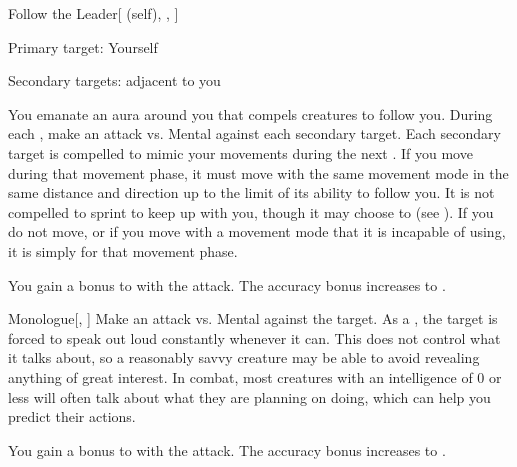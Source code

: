 \lowercase{\hypertarget{spell:Follow the Leader}{}}\label{spell:Follow the Leader}
\begin{attuneability}[Rank 3]{\hypertarget{spell:Follow the Leader}{Follow the Leader}}[ (self), , ]

Primary target: Yourself
\par\noindent
Secondary targets:  adjacent to you

You emanate an aura around you that compels creatures to follow you.
During each , make an attack vs. Mental against each secondary target.
\hit Each secondary target is compelled to mimic your movements during the next .
If you move during that movement phase, it must move with the same movement mode in the same distance and direction up to the limit of its ability to follow you.
It is not compelled to sprint to keep up with you, though it may choose to (see ).
If you do not move, or if you move with a movement mode that it is incapable of using, it is simply  for that movement phase.

\rankline
{} You gain a  bonus to  with the attack.
 The accuracy bonus increases to .
\end{attuneability}
\vspace{0.25em}



\lowercase{\hypertarget{spell:Monologue}{}}\label{spell:Monologue}
\begin{freeability}[Rank 3]{\hypertarget{spell:Monologue}{Monologue}}[, ]
Make an attack vs. Mental against the target.
\hit As a , the target is forced to speak out loud constantly whenever it can.
This does not control what it talks about, so a reasonably savvy creature may be able to avoid revealing anything of great interest.
In combat, most creatures with an intelligence of 0 or less will often talk about what they are planning on doing, which can help you predict their actions.

\rankline
{} You gain a  bonus to  with the attack.
 The accuracy bonus increases to .
\end{freeability}
\vspace{0.25em}



